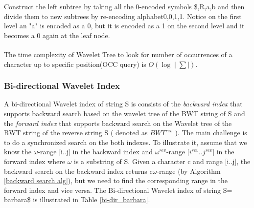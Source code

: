 \documentclass[11pt,a4paper]{report}
\begin{document}
Construct the left subtree by taking all the 0-encoded symbols {\$,R,a,b} and
then divide them to new subtrees by re-encoding alphabet{0,0,1,1}.
Notice on the first level an "a" is encoded as a 0, but it is encoded as a 
1 on the second level and it becomes a 0 again at the leaf node.\\\\
The time complexity of Wavelet Tree to look for number of occurrences of a 
character up to specific position(OCC query) is $O(\log{}\mid\sum\mid)$.





\subsubsection{Bi-directional Wavelet Index}

A bi-directional Wavelet index of string S is consists of \cite{bidirectional}
the \emph{backward index} that supports backward search based on the wavelet tree of 
the BWT string of S and the \emph{forward index} that supports backward search
on the Wavelet tree of the BWT string of the reverse string S ( denoted as 
$BWT^{rev}$ ). The main challenge is to do a synchronized search on the both indexes.
To illustrate it, assume that we know the $\omega$-range [i..j] in the backward 
index and $\omega^{rev}$-range [$i^{rev}$..$j^{rev}$] in the forward index 
where $\omega$ is a substring of S.
Given a character c and range [i..j], the backward search on the backward 
index returns c$\omega$-range (by Algorithm \ref{backward search alg}), 
but we need to find the corresponding range in the forward index and vice versa.
The Bi-directional Wavelet index of string S= barbara\$ is 
illustrated in Table \ref{bi-dir_barbara}.
\end{document}
